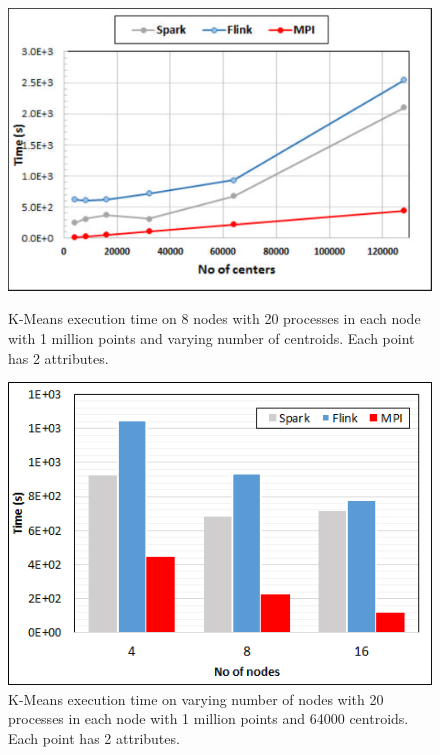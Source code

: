 \documentclass[conference]{IEEEtran}
\begin{document}
\begin{figure}[!htb]
\begin{minipage}{.49\textwidth}
    \centering
    \includegraphics[width=0.95\columnwidth]{images/flink-small-centers.pdf}
    \caption{K-Means execution time on 8 nodes with 20 processes in each node with 1 million points and varying number of centroids. Each point has 2 attributes.}
    \label{fig:fig_k_means_small_centroids}
\end{minipage}
\hspace{1.4mm}
\begin{minipage}{.49\textwidth}
    \centering
    \includegraphics[width=0.95\columnwidth]{images/k-means-small.png}
    \caption{K-Means execution time on varying number of nodes with 20 processes in each node with 1 million points and 64000 centroids. Each point has 2 attributes.}
    \label{fig:fig_k_means_small_nodes}
\end{minipage}
\end{figure}
\end{document}
